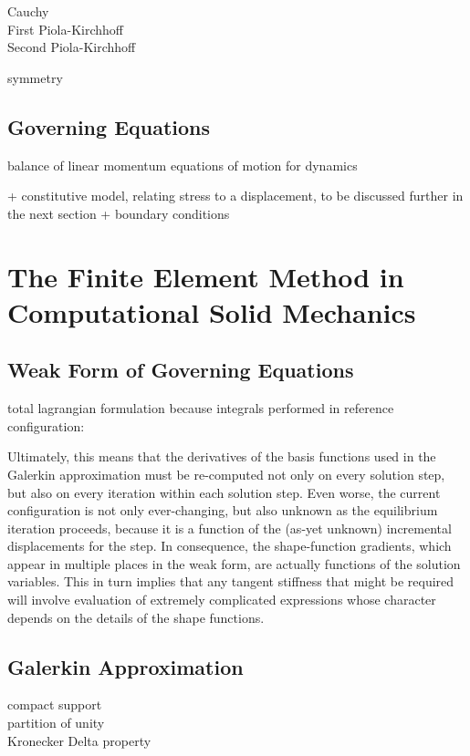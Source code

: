 Cauchy \\
First Piola-Kirchhoff \\
Second Piola-Kirchhoff

symmetry

\subsection{Governing Equations}
balance of linear momentum
equations of motion for dynamics

+ constitutive model, relating stress to a displacement, to be discussed further in the next section
+ boundary conditions

\section{The Finite Element Method in Computational Solid Mechanics}
\label{The Finite Element Method in Computational Solid Mechanics}

\subsection{Weak Form of Governing Equations}
total lagrangian formulation because integrals performed in reference configuration:

Ultimately, this means that the derivatives of the basis functions used in the Galerkin approximation must be re-computed not only on every solution step, but also on every iteration within each solution step. Even worse, the current configuration is not only ever-changing, but also unknown as the equilibrium iteration proceeds, because it is a function of the (as-yet unknown) incremental displacements for the step. In consequence, the shape-function gradients, which appear in multiple places in the weak form, are actually functions of the solution variables. This in turn implies that any tangent stiffness that might be required will involve evaluation of extremely complicated expressions whose character depends on the details of the shape functions.

\subsection{Galerkin Approximation}

compact support \\
partition of unity \\
Kronecker Delta property \\

